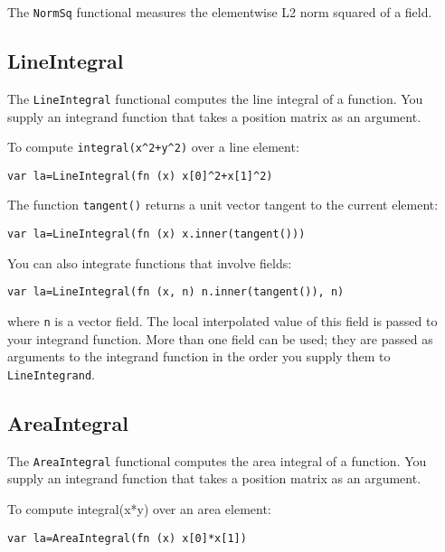 The \texttt{NormSq} functional measures the elementwise L2 norm squared
of a field.

\hypertarget{lineintegral}{%
\subsection{LineIntegral}\label{lineintegral}}

The \texttt{LineIntegral} functional computes the line integral of a
function. You supply an integrand function that takes a position matrix
as an argument.

To compute \texttt{integral(x\^{}2+y\^{}2)} over a line element:

\begin{lstlisting}
var la=LineIntegral(fn (x) x[0]^2+x[1]^2)
\end{lstlisting}

The function \texttt{tangent()} returns a unit vector tangent to the
current element:

\begin{lstlisting}
var la=LineIntegral(fn (x) x.inner(tangent()))
\end{lstlisting}

You can also integrate functions that involve fields:

\begin{lstlisting}
var la=LineIntegral(fn (x, n) n.inner(tangent()), n)
\end{lstlisting}

where \texttt{n} is a vector field. The local interpolated value of this
field is passed to your integrand function. More than one field can be
used; they are passed as arguments to the integrand function in the
order you supply them to \texttt{LineIntegrand}.

\hypertarget{areaintegral}{%
\subsection{AreaIntegral}\label{areaintegral}}

The \texttt{AreaIntegral} functional computes the area integral of a
function. You supply an integrand function that takes a position matrix
as an argument.

To compute integral(x*y) over an area element:

\begin{lstlisting}
var la=AreaIntegral(fn (x) x[0]*x[1])
\end{lstlisting}

